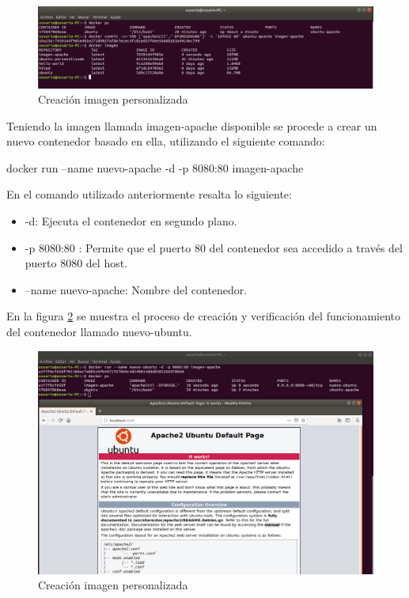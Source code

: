 \begin{figure}[!hbtp]
	\centering
	\includegraphics[width=\linewidth]{RE05_Docker/Caso_resuelto/REDocker_Caso1.png}
	\vspace{-0.2cm}
	\caption{Creación imagen personalizada}
	\label{fig:DockerCaso1}
\end{figure}

Teniendo la imagen llamada imagen-apache disponible se procede a crear un nuevo contenedor basado en ella, utilizando el siguiente comando:

\begin{commandshell}
docker run --name nuevo-apache -d -p 8080:80 imagen-apache
\end{commandshell}

En el comando utilizado anteriormente resalta lo siguiente:
\begin{itemize}
    \item -d: Ejecuta el contenedor en segundo plano.
    \item -p 8080:80 : Permite que el puerto 80 del contenedor sea accedido a través del puerto 8080 del host.
    \item --name nuevo-apache: Nombre del contenedor.
\end{itemize}

En la figura \ref{fig:DockerCaso2} se muestra el proceso de creación y verificación del funcionamiento del contenedor llamado nuevo-ubuntu.

\begin{figure}[!hbtp]
	\centering
	\includegraphics[width=\linewidth]{RE05_Docker/Caso_resuelto/REDocker_Caso2.png}
	\vspace{-0.2cm}
	\caption{Creación imagen personalizada}
	\label{fig:DockerCaso2}
\end{figure}